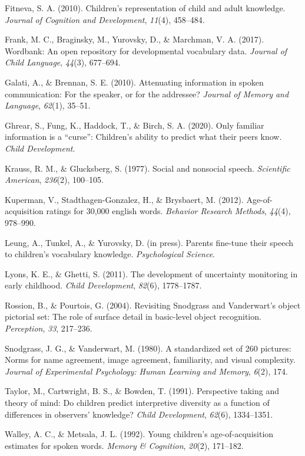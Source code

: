 \documentclass[10pt, letterpaper]{article}
\begin{document}
\leavevmode\hypertarget{ref-fitneva2010}{}%
Fitneva, S. A. (2010). Children's representation of child and adult
knowledge. \emph{Journal of Cognition and Development}, \emph{11}(4),
458--484.

\leavevmode\hypertarget{ref-frank2017}{}%
Frank, M. C., Braginsky, M., Yurovsky, D., \& Marchman, V. A. (2017).
Wordbank: An open repository for developmental vocabulary data.
\emph{Journal of Child Language}, \emph{44}(3), 677--694.

\leavevmode\hypertarget{ref-galati2010}{}%
Galati, A., \& Brennan, S. E. (2010). Attenuating information in spoken
communication: For the speaker, or for the addressee? \emph{Journal of
Memory and Language}, \emph{62}(1), 35--51.

\leavevmode\hypertarget{ref-ghrear2020}{}%
Ghrear, S., Fung, K., Haddock, T., \& Birch, S. A. (2020). Only familiar
information is a ``curse'': Children's ability to predict what their
peers know. \emph{Child Development}.

\leavevmode\hypertarget{ref-krauss1977}{}%
Krauss, R. M., \& Glucksberg, S. (1977). Social and nonsocial speech.
\emph{Scientific American}, \emph{236}(2), 100--105.

\leavevmode\hypertarget{ref-kuperman2012}{}%
Kuperman, V., Stadthagen-Gonzalez, H., \& Brysbaert, M. (2012).
Age-of-acquisition ratings for 30,000 english words. \emph{Behavior
Research Methods}, \emph{44}(4), 978--990.

\leavevmode\hypertarget{ref-leung2021}{}%
Leung, A., Tunkel, A., \& Yurovsky, D. (in press). Parents fine-tune
their speech to children's vocabulary knowledge. \emph{Psychological
Science}.

\leavevmode\hypertarget{ref-lyons2011}{}%
Lyons, K. E., \& Ghetti, S. (2011). The development of uncertainty
monitoring in early childhood. \emph{Child Development}, \emph{82}(6),
1778--1787.

\leavevmode\hypertarget{ref-rossion2004}{}%
Rossion, B., \& Pourtois, G. (2004). Revisiting Snodgrass and
Vanderwart's object pictorial set: The role of surface detail in
basic-level object recognition. \emph{Perception}, \emph{33}, 217--236.

\leavevmode\hypertarget{ref-snodgrass1980}{}%
Snodgrass, J. G., \& Vanderwart, M. (1980). A standardized set of 260
pictures: Norms for name agreement, image agreement, familiarity, and
visual complexity. \emph{Journal of Experimental Psychology: Human
Learning and Memory}, \emph{6}(2), 174.

\leavevmode\hypertarget{ref-taylor1991}{}%
Taylor, M., Cartwright, B. S., \& Bowden, T. (1991). Perspective taking
and theory of mind: Do children predict interpretive diversity as a
function of differences in observers' knowledge? \emph{Child
Development}, \emph{62}(6), 1334--1351.

\leavevmode\hypertarget{ref-walley1992}{}%
Walley, A. C., \& Metsala, J. L. (1992). Young children's
age-of-acquisition estimates for spoken words. \emph{Memory \&
Cognition}, \emph{20}(2), 171--182.


\end{document}
